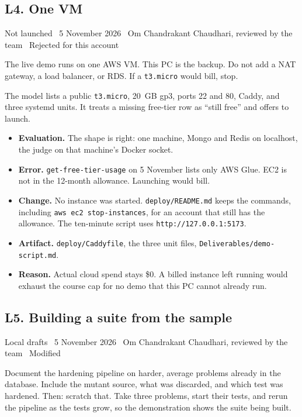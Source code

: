 \documentclass[11pt,a4paper]{article}
\newcommand{\meta}[1]{{\small #1}\par}
\newcommand{\step}[1]{\par\vspace{0.15em}{\bfseries #1}\par\vspace{-0.15em}}
\begin{document}
\subsection{L4. One VM}
\meta{Not launched \textperiodcentered\ 5 November 2026 \textperiodcentered\ Om Chandrakant Chaudhari, reviewed by the team \textperiodcentered\ Rejected for this account}

\step{1. Prompt}
The live demo runs on one AWS VM. This PC is the backup. Do not add a NAT gateway, a load balancer, or RDS. If a \texttt{t3.micro} would bill, stop.

\step{2. Reply (summarised)}
The model lists a public \texttt{t3.micro}, 20~GB gp3, ports 22 and 80, Caddy, and three systemd units. It treats a missing free-tier row as ``still free'' and offers to launch.

\step{3. Decision}
\begin{itemize}
\item \textbf{Evaluation.} The shape is right: one machine, Mongo and Redis on localhost, the judge on that machine's Docker socket.
\item \textbf{Error.} \texttt{get-free-tier-usage} on 5 November lists only AWS Glue. EC2 is not in the 12-month allowance. Launching would bill.
\item \textbf{Change.} No instance was started. \texttt{deploy/README.md} keeps the commands, including \texttt{aws ec2 stop-instances}, for an account that still has the allowance. The ten-minute script uses \texttt{http://127.0.0.1:5173}.
\item \textbf{Artifact.} \texttt{deploy/Caddyfile}, the three unit files, \texttt{Deliverables/demo-script.md}.
\item \textbf{Reason.} Actual cloud spend stays \$0. A billed instance left running would exhaust the course cap for no demo that this PC cannot already run.
\end{itemize}

\subsection{L5. Building a suite from the sample}
\meta{Local drafts \textperiodcentered\ 5 November 2026 \textperiodcentered\ Om Chandrakant Chaudhari, reviewed by the team \textperiodcentered\ Modified}

\step{1. Prompt}
Document the hardening pipeline on harder, average problems already in the database. Include the mutant source, what was discarded, and which test was hardened. Then: scratch that. Take three problems, start their tests, and rerun the pipeline as the tests grow, so the demonstration shows the suite being built.
\end{document}
